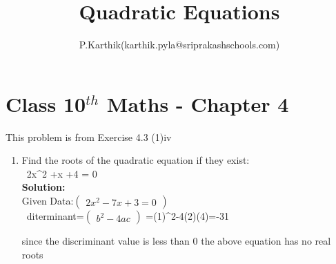 \documentclass[12pt]{article}
\title{Quadratic Equations}
\author{P.Karthik(karthik.pyla@sriprakashschools.com)}
\newcommand{\myvec}[1]{\ensuremath{\begin{pmatrix}#1\end{pmatrix}}}
\newcommand{\solution}{\noindent \textbf{Solution: }}
\begin{document}
\maketitle
\section*{Class 10$^{th}$ Maths - Chapter 4}
This problem is from Exercise 4.3 (1)iv
\begin{enumerate}
\item   Find the roots of the quadratic equation if they exist:\\
 \ 2x{^2} +x +4 = 0\\
\solution \\
Given Data:\myvec{2x^2- 7x + 3 = 0}\\
\ diterminant=\myvec {b^2-4ac} =(1)^2-4(2)(4)=-31

since the discriminant value is less than 0 the above equation has no real roots


\end{enumerate}
\end{document}

